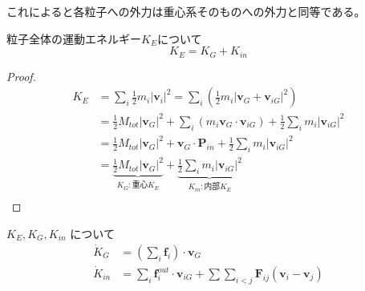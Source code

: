 \documentclass[dvipdfmx,uplatex]{jsarticle}
\begin{document}
これによると各粒子への外力は重心系そのものへの外力と同等である。

\begin{theo}
粒子全体の運動エネルギー$K_E$について \\
$$
K_E = K_G + K_{in}
$$
\end{theo}

\begin{proof}
  \begin{align*}
    K_E &= \sum_i \frac{1}{2} m_i |\bm{v}_i|^2
    = \sum_i \left( \frac{1}{2} m_i | \bm{v}_G + \bm{v}_{iG} |^2 \right)\\
    &= \frac{1}{2} M_{tot} |\bm{v}_G|^2 + \sum_i ( m_i \bm{v}_G \cdot \bm{v}_{iG} ) + \frac{1}{2} \sum_i m_i |\bm{v}_{iG}|^2 \\
    &= \frac{1}{2} M_{tot} |\bm{v}_G|^2 + \bm{v}_G \cdot \bm{P}_{in} + \frac{1}{2} \sum_i m_i |\bm{v}_{iG}|^2 \\
    &= \underbrace{\frac{1}{2} M_{tot} |\bm{v}_G|^2}_{K_G:重心K_E} + \underbrace{\frac{1}{2} \sum_i m_i |\bm{v}_{iG}|^2}_{K_{in}:内部K_E} \\
  \end{align*}
\end{proof}

\begin{cor}
$K_E, K_G, K_{in}$ について \\
\begin{align*}
\dot{K}_G &= \left( \sum_i \bm{f}_i \right) \cdot \bm{v}_G \\
\dot{K}_{in} &= \sum_i \bm{f}^{out}_i \cdot \bm{v}_{iG} + \sum\sum_{i<j} \bm{F}_{ij} (\bm{v}_i - \bm{v}_j)
\end{align*}
\end{cor}
\end{document}
